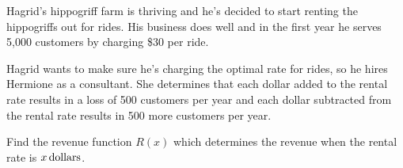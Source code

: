 \documentclass[fleqn,addpoints]{exam}
\begin{document}
\begin{questions}

  \pagebreak


  \bonusquestion
    Hagrid's hippogriff farm is thriving and he's decided to start renting the hippogriffs out for rides.  His business
    does well and in the first year he serves 5,000 customers by charging \$30 per ride.

    Hagrid wants to make sure he's charging the optimal rate for rides, so he hires Hermione as a consultant.  She
    determines that each dollar added to the rental rate results in a loss of 500 customers per year and each dollar
    subtracted from the rental rate results in 500 more customers per year.


    \begin{parts}
      \bonuspart[10] Find the revenue function $R(x)$ which determines the revenue when the rental rate is
        $\unit[x]{dollars}$.


\end{parts}
\end{questions}
\end{document}
